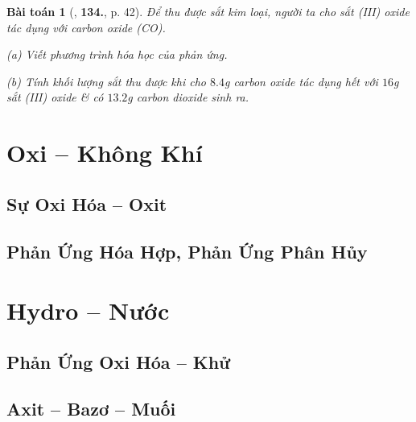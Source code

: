 \documentclass{article}
\numberwithin{equation}{section}
\newtheorem{baitoan}{Bài toán}[section]
\begin{document}
\begin{baitoan}[\cite{An2011}, \textbf{134.}, p. 42]
	Để thu được sắt kim loại, người ta cho sắt (III) oxide tác dụng với carbon oxide (\emph{CO}).
	\begin{enumerate*}
		\item[(a)] Viết phương trình hóa học của phản ứng.
		\item[(b)] Tính khối lượng sắt thu được khi cho $8.4$\emph{g} carbon oxide tác dụng hết với $16$\emph{g} sắt (III) oxide \& có $13.2$\emph{g} carbon dioxide sinh ra.
	\end{enumerate*}
\end{baitoan}




\section{Oxi -- Không Khí}

\subsection{Sự Oxi Hóa -- Oxit}


\subsection{Phản Ứng Hóa Hợp, Phản Ứng Phân Hủy}


\section{Hydro -- Nước}

\subsection{Phản Ứng Oxi Hóa -- Khử}


\subsection{Axit -- Bazơ -- Muối}
\end{document}
